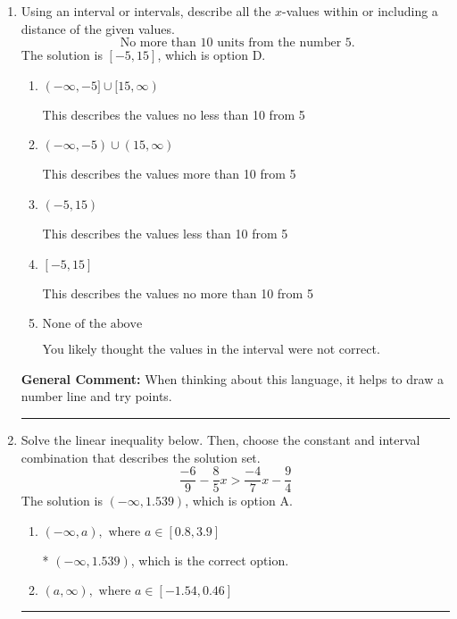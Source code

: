 \documentclass{extbook}[14pt]
\newcommand{\litem}[1]{\item #1

\rule{\textwidth}{0.4pt}}
\begin{document}
\begin{enumerate}
{\begin{enumerate}[label=\Alph*.]
This describes the values more than 3 from 7
\item \( (-\infty, 4] \cup [10, \infty) \)

This describes the values no less than 3 from 7
\item \( [4, 10] \)

This describes the values no more than 3 from 7
\item \( \text{None of the above} \)

You likely thought the values in the interval were not correct.
\end{enumerate}

\textbf{General Comment:} When thinking about this language, it helps to draw a number line and try points.
}
\litem{
Using an interval or intervals, describe all the $x$-values within or including a distance of the given values.
\[ \text{ No more than } 10 \text{ units from the number } 5. \]The solution is \( [-5, 15] \), which is option D.\begin{enumerate}[label=\Alph*.]
\item \( (-\infty, -5] \cup [15, \infty) \)

This describes the values no less than 10 from 5
\item \( (-\infty, -5) \cup (15, \infty) \)

This describes the values more than 10 from 5
\item \( (-5, 15) \)

This describes the values less than 10 from 5
\item \( [-5, 15] \)

This describes the values no more than 10 from 5
\item \( \text{None of the above} \)

You likely thought the values in the interval were not correct.
\end{enumerate}

\textbf{General Comment:} When thinking about this language, it helps to draw a number line and try points.
}
\litem{
Solve the linear inequality below. Then, choose the constant and interval combination that describes the solution set.
\[ \frac{-6}{9} - \frac{8}{5} x > \frac{-4}{7} x - \frac{9}{4} \]The solution is \( (-\infty, 1.539) \), which is option A.\begin{enumerate}[label=\Alph*.]
\item \( (-\infty, a), \text{ where } a \in [0.8, 3.9] \)

* $(-\infty, 1.539)$, which is the correct option.
\item \( (a, \infty), \text{ where } a \in [-1.54, 0.46] \)


\end{enumerate}}
\end{enumerate}
\end{document}
